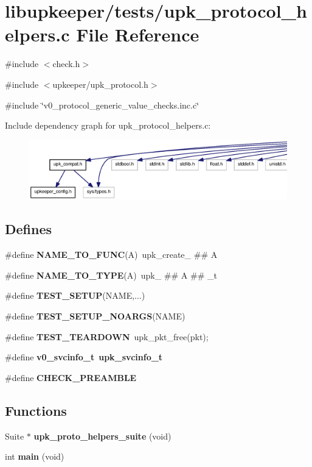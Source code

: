 \section{libupkeeper/tests/upk\_\-protocol\_\-helpers.c File Reference}
\label{upk__protocol__helpers_8c}
{\ttfamily \#include $<$check.h$>$}\par
{\ttfamily \#include $<$upkeeper/upk\_\-protocol.h$>$}\par
{\ttfamily \#include \char`\"{}v0\_\-protocol\_\-generic\_\-value\_\-checks.inc.c\char`\"{}}\par
Include dependency graph for upk\_\-protocol\_\-helpers.c:\nopagebreak
\begin{figure}[H]
\begin{center}
\leavevmode
\includegraphics[width=400pt]{upk__protocol__helpers_8c__incl}
\end{center}
\end{figure}
\subsection*{Defines}
\begin{DoxyCompactItemize}
\item 
\#define {\bf NAME\_\-TO\_\-FUNC}(A)~upk\_\-create\_\- \#\# A
\item 
\#define {\bf NAME\_\-TO\_\-TYPE}(A)~upk\_\- \#\# A \#\# \_\-t
\item 
\#define {\bf TEST\_\-SETUP}(NAME,...)
\item 
\#define {\bf TEST\_\-SETUP\_\-NOARGS}(NAME)
\item 
\#define {\bf TEST\_\-TEARDOWN}~upk\_\-pkt\_\-free(pkt);
\item 
\#define {\bf v0\_\-svcinfo\_\-t}~{\bf upk\_\-svcinfo\_\-t}
\item 
\#define {\bf CHECK\_\-PREAMBLE}
\end{DoxyCompactItemize}
\subsection*{Functions}
\begin{DoxyCompactItemize}
\item 
Suite $\ast$ {\bf upk\_\-proto\_\-helpers\_\-suite} (void)
\item 
int {\bf main} (void)
\end{DoxyCompactItemize}



